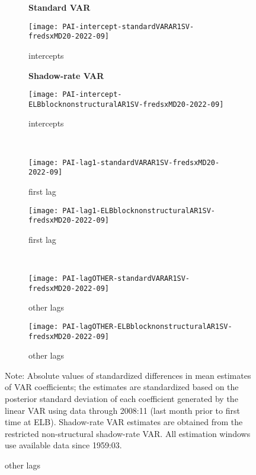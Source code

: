 \documentclass[12pt]{article}
\newlength{\picwid}
\begin{document}
\begin{figure}
\setlength{\picwid}{.4\textwidth}
\caption{Parameter changes over time}
\label{fig:PAIsinceGFC0}
\begin{center}
\begin{subfigure}[b]{\picwid}
\centering\textbf{Standard VAR}\vspace{0.5\baselineskip}
\caption{intercepts}
\label{subfig:pai:standard:intercepts}
\texttt{[image: PAI-intercept-standardVARAR1SV-fredsxMD20-2022-09]}
\end{subfigure}
\quad
\begin{subfigure}[b]{\picwid}
\centering\textbf{Shadow-rate VAR}\vspace{0.5\baselineskip}
\caption{intercepts}
\label{subfig:pai:nonstructural:intercepts}
\texttt{[image: PAI-intercept-ELBblocknonstructuralAR1SV-fredsxMD20-2022-09]}
\end{subfigure}
\\
\begin{subfigure}[b]{\picwid}
\caption{first lag}
\label{subfig:pai:standard:lag1}
\texttt{[image: PAI-lag1-standardVARAR1SV-fredsxMD20-2022-09]}
\end{subfigure}
\quad
\begin{subfigure}[b]{\picwid}
\caption{first lag}
\label{subfig:pai:nonstructural:lag1}
\texttt{[image: PAI-lag1-ELBblocknonstructuralAR1SV-fredsxMD20-2022-09]}
\end{subfigure}
\\
\begin{subfigure}[b]{\picwid}
\caption{other lags}
\label{subfig:pai:standard:lagother}
\texttt{[image: PAI-lagOTHER-standardVARAR1SV-fredsxMD20-2022-09]}
\end{subfigure}
\quad
\begin{subfigure}[b]{\picwid}
\caption{other lags}
\label{subfig:pai:nonstructural:lagother}
\texttt{[image: PAI-lagOTHER-ELBblocknonstructuralAR1SV-fredsxMD20-2022-09]}
\end{subfigure}
\end{center}
Note: Absolute values of standardized differences in mean estimates of VAR coefficients; the estimates are standardized based on the posterior standard deviation of each coefficient generated by the linear VAR using data through 2008:11 (last month prior to first time at ELB). Shadow-rate VAR estimates are obtained from the restricted non-structural shadow-rate VAR. All estimation windows use available data since 1959:03.
\end{figure}
\end{document}
